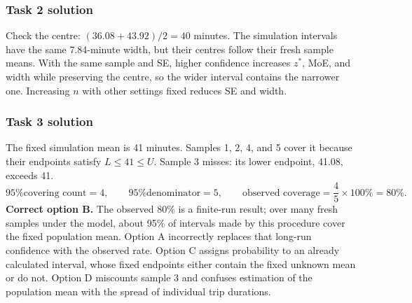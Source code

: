 \subsubsection*{Task 2 solution}
Check the centre: $(36.08+43.92)/2=40$ minutes. The simulation intervals have the same 7.84-minute width, but their centres follow their fresh sample means. With the same sample and SE, higher confidence increases $z^*$, MoE, and width while preserving the centre, so the wider interval contains the narrower one. Increasing $n$ with other settings fixed reduces SE and width.

\subsubsection*{Task 3 solution}
The fixed simulation mean is 41 minutes. Samples 1, 2, 4, and 5 cover it because their endpoints satisfy $L\leq41\leq U$. Sample 3 misses: its lower endpoint, 41.08, exceeds 41.
\[
\text{95\% covering count}=4,\qquad
\text{95\% denominator}=5,\qquad
\text{observed coverage}=\frac45\times100\%=80\%.
\]
\textbf{Correct option B.} The observed 80\% is a finite-run result; over many fresh samples under the model, about 95\% of intervals made by this procedure cover the fixed population mean. Option A incorrectly replaces that long-run confidence with the observed rate. Option C assigns probability to an already calculated interval, whose fixed endpoints either contain the fixed unknown mean or do not. Option D miscounts sample 3 and confuses estimation of the population mean with the spread of individual trip durations.

